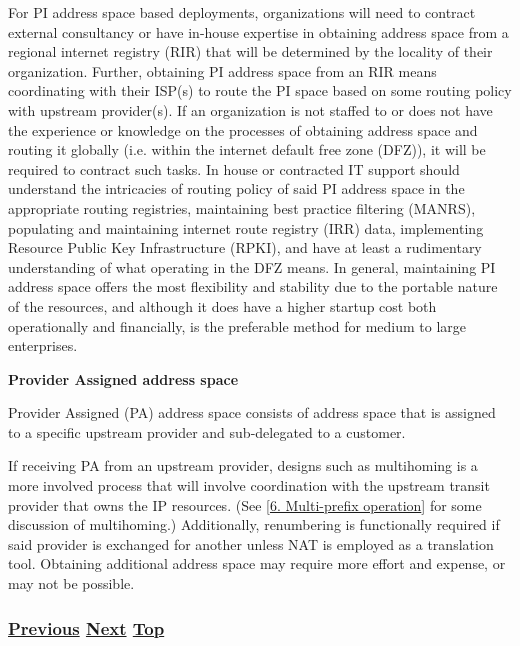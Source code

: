 \documentclass[
]{article}
\begin{document}
For PI address space based deployments, organizations will need to
contract external consultancy or have in-house expertise in obtaining
address space from a regional internet registry (RIR) that will be
determined by the locality of their organization. Further, obtaining PI
address space from an RIR means coordinating with their ISP(s) to route
the PI space based on some routing policy with upstream provider(s). If
an organization is not staffed to or does not have the experience or
knowledge on the processes of obtaining address space and routing it
globally (i.e. within the internet default free zone (DFZ)), it will be
required to contract such tasks. In house or contracted IT support
should understand the intricacies of routing policy of said PI address
space in the appropriate routing registries, maintaining best practice
filtering (MANRS), populating and maintaining internet route registry
(IRR) data, implementing Resource Public Key Infrastructure (RPKI), and
have at least a rudimentary understanding of what operating in the DFZ
means. In general, maintaining PI address space offers the most
flexibility and stability due to the portable nature of the resources,
and although it does have a higher startup cost both operationally and
financially, is the preferable method for medium to large enterprises.

\textbf{Provider Assigned address space}

Provider Assigned (PA) address space consists of address space that is
assigned to a specific upstream provider and sub-delegated to a
customer.

If receiving PA from an upstream provider, designs such as multihoming
is a more involved process that will involve coordination with the
upstream transit provider that owns the IP resources. (See
{[}\hyperref[multi-prefix-operation]{6. Multi-prefix operation}{]} for
some discussion of multihoming.) Additionally, renumbering is
functionally required if said provider is exchanged for another unless
NAT is employed as a translation tool. Obtaining additional address
space may require more effort and expense, or may not be possible.

\subsubsection{\texorpdfstring{\hyperref[deployment-in-the-home]{Previous}
\hyperref[troubleshooting]{Next}
\hyperref[deployment-status]{Top}}{Previous Next Top}}\label{previous-next-top-37}
\end{document}
